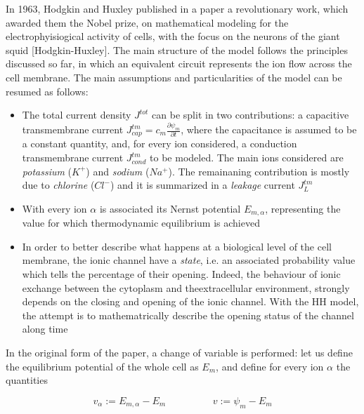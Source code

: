 \documentclass[a4paper]{article}
\begin{document}
In 1963, Hodgkin and Huxley published in a paper a revolutionary work, which awarded them the Nobel prize, on mathematical modeling for the electrophyisiogical activity of cells, with the focus on the neurons of the giant squid [Hodgkin-Huxley]. The main structure of the model follows the principles discussed so far, in which an equivalent circuit represents the ion flow across the cell membrane. The main assumptions and particularities of the model can be resumed as follows:

\begin{itemize}
	
	\item The total current density $J^{tot}$ can be split in two contributions: a capacitive transmembrane current $J_{cap}^{tm} = c_m \frac{\partial \psi_m}{\partial t}$, where the capacitance is assumed to be a constant quantity, and, for every ion considered, a conduction transmembrane current  $J_{cond}^{tm}$ to be modeled. The main ions considered are \textit{potassium} ($K^+$) and \textit{sodium} ($Na^+$). The remainaning contribution is mostly due to \textit{chlorine} ($Cl^-$) and it is summarized in a \textit{leakage} current $J_L^{tm}$
	
	\item With every ion $\alpha$ is associated its Nernst potential $E_{m,\alpha}$, representing the value for which thermodynamic equilibrium is achieved
	
	\item In order to better describe what happens at a biological level of the cell membrane, the ionic channel have a \textit{state}, i.e. an associated probability value which tells the percentage of their opening. Indeed, the behaviour of ionic exchange between the cytoplasm and theextracellular environment, strongly depends on the closing and opening of the ionic channel. With the HH model, the attempt is to mathematrically describe the opening status of the channel along time
	
	
\end{itemize}	


In the original form of the paper, a change of variable is performed: let us define the equilibrium potential of the whole cell as $E_m$, and define for every ion $\alpha$ the quantities

\begin{equation}
	v_\alpha := E_{m,\alpha} - E_m \hspace{2cm}  v := \psi_m - E_m
\end{equation}
	
\end{document}
